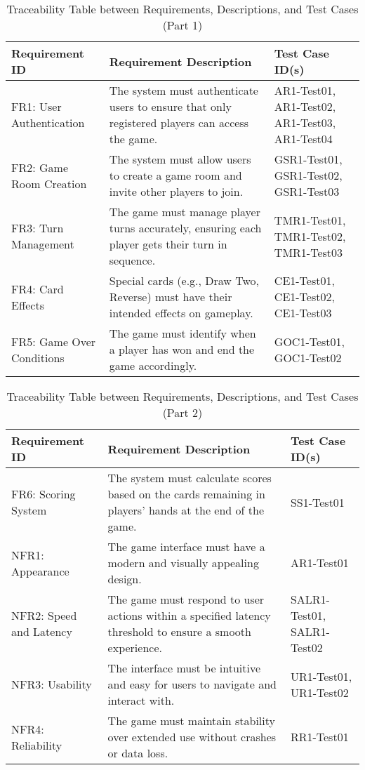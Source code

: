 \documentclass[12pt, titlepage]{article}
\begin{document}
\begin{table}[H]
\centering
\begin{tabularx}{\textwidth}{|l|X|X|}
\hline
\textbf{Requirement ID} & \textbf{Requirement Description} & \textbf{Test Case ID(s)} \\ \hline
FR1: User Authentication & The system must authenticate users to ensure that only registered players can access the game. & AR1-Test01, AR1-Test02, AR1-Test03, AR1-Test04 \\ \hline
FR2: Game Room Creation & The system must allow users to create a game room and invite other players to join. & GSR1-Test01, GSR1-Test02, GSR1-Test03 \\ \hline
FR3: Turn Management & The game must manage player turns accurately, ensuring each player gets their turn in sequence. & TMR1-Test01, TMR1-Test02, TMR1-Test03 \\ \hline
FR4: Card Effects & Special cards (e.g., Draw Two, Reverse) must have their intended effects on gameplay. & CE1-Test01, CE1-Test02, CE1-Test03 \\ \hline
FR5: Game Over Conditions & The game must identify when a player has won and end the game accordingly. & GOC1-Test01, GOC1-Test02 \\ \hline
\end{tabularx}
\caption{Traceability Table between Requirements, Descriptions, and Test Cases (Part 1)}
\end{table}

\begin{table}[H]
\centering
\begin{tabularx}{\textwidth}{|l|X|X|}
\hline
\textbf{Requirement ID} & \textbf{Requirement Description} & \textbf{Test Case ID(s)} \\ \hline
FR6: Scoring System & The system must calculate scores based on the cards remaining in players’ hands at the end of the game. & SS1-Test01 \\ \hline
NFR1: Appearance & The game interface must have a modern and visually appealing design. & AR1-Test01 \\ \hline
NFR2: Speed and Latency & The game must respond to user actions within a specified latency threshold to ensure a smooth experience. & SALR1-Test01, SALR1-Test02 \\ \hline
NFR3: Usability & The interface must be intuitive and easy for users to navigate and interact with. & UR1-Test01, UR1-Test02 \\ \hline
NFR4: Reliability & The game must maintain stability over extended use without crashes or data loss. & RR1-Test01 \\ \hline
\end{tabularx}
\caption{Traceability Table between Requirements, Descriptions, and Test Cases (Part 2)}
\end{table}
\end{document}
